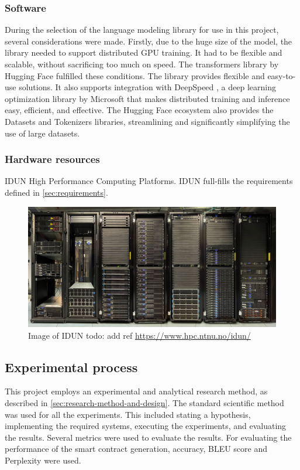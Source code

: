 \subsubsection{Software}
\label{sec:software}
During the selection of the language modeling library for use in this project, several considerations were made. Firstly, due to the huge size of the model, the library needed to support distributed GPU training. It had to be flexible and scalable, without sacrificing too much on speed. The transformers \cite{transformers} library by Hugging Face \cite{hugging-face} fulfilled these conditions. The library provides flexible and easy-to-use solutions. It also supports integration with DeepSpeed \cite{deepspeed}, a deep learning optimization library by Microsoft \cite{microsoft} that makes distributed training and inference easy, efficient, and effective. The Hugging Face ecosystem also provides the Datasets and Tokenizers libraries, streamlining and significantly simplifying the use of large datasets.

\subsubsection{Hardware resources}
\label{sec:hardware-resources}

IDUN High Performance Computing Platforms.
IDUN full-fills the requirements defined in \cref{sec:requirements}.

\begin{figure}[htp]
    \centering
    \includegraphics[width=\textwidth]{figures/idun.jpeg}
    \caption{Image of IDUN todo: add ref \url{https://www.hpc.ntnu.no/idun/}}
    \label{fig:flowchart}
\end{figure}

\subsection{Experimental process}
\label{sec:experimental-process}
This project employs an experimental and analytical research method, as described in \cref{sec:research-method-and-design}. The standard scientific method was used for all the experiments. This included stating a hypothesis, implementing the required systems, executing the experiments, and evaluating the results. Several metrics were used to evaluate the results. For evaluating the performance of the smart contract generation, accuracy, BLEU score and Perplexity were used. 


